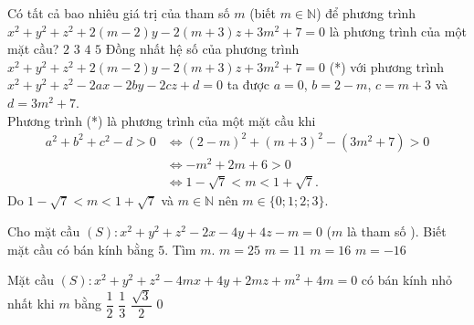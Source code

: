 \begin{ex}%
	Có tất cả bao nhiêu giá trị của tham số $m$ (biết $m \in \mathbb{N}$) để phương trình $x^2 + y^2 + z^2 + 2(m-2)y - 2(m+3)z + 3m^2 + 7 = 0$ là phương trình của một mặt cầu?
	\choice
	{$2$}
	{$3$}
	{\True $4$}
	{$5$}
	\loigiai
	{
		Đồng nhất hệ số của phương trình $x^2 + y^2 + z^2 + 2(m-2)y - 2(m+3)z + 3m^2 + 7 = 0$ (*) với phương trình $x^2 + y^2 + z^2 - 2ax - 2by - 2cz + d = 0$ ta được $a = 0$, $b = 2 - m$, $c = m + 3$ và $d = 3m^2 + 7$.\\
		Phương trình (*) là phương trình của một mặt cầu khi
		\begin{align*}
			a^2 + b^2 + c^2 - d > 0 & \Leftrightarrow (2-m)^2 + (m+3)^2 - (3m^2 + 7) > 0 \\
			& \Leftrightarrow -m^2 + 2m + 6 > 0 \\
			& \Leftrightarrow 1 - \sqrt{7} < m < 1 + \sqrt{7}.
		\end{align*}
		Do $1 - \sqrt{7} < m < 1 + \sqrt{7}$ và $m \in \mathbb{N}$ nên $m \in \{ 0; 1; 2; 3 \}$.
	}
\end{ex}

\begin{ex}%
	Cho mặt cầu $(S)\colon x^2 + y^2+ z^2 -2x - 4y + 4z - m = 0$ ($m$ là tham số ). Biết mặt cầu có  bán kính bằng $5$. Tìm $m$.
	\choice%
	{$m=25$}
	{$m=11$}
	{\True $m=16$}
	{$m=-16$}
\end{ex}

\begin{ex} 
	Mặt cầu $(S):x^2+y^2+z^2-4mx+4y+2mz+m^2+4m=0$ có bán kính nhỏ nhất khi $m$ bằng
	\choice
	{\True$\dfrac{1}{2}$}
	{$\dfrac{1}{3}$}
	{$\dfrac{\sqrt{3}}{2}$}
	{$0$}
\end{ex}

